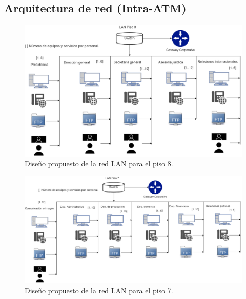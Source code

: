 \documentclass[12pt,letterpaper]{article}
\begin{document}
\subsection{Arquitectura de red (Intra-ATM)}
\begin{figure}[ht]
    \centering
    \includegraphics[width=.9\textwidth,angle=90]{imagenes/Lan8.png}
    \caption{Diseño propuesto de la red LAN para el piso 8.}
\end{figure}

\newpage
\begin{figure}[ht]
    \centering
    \includegraphics[width=.9\textwidth,angle=90]{imagenes/Lan7.png}
    \caption{Diseño propuesto de la red LAN para el piso 7.}
\end{figure}

\newpage
\end{document}
